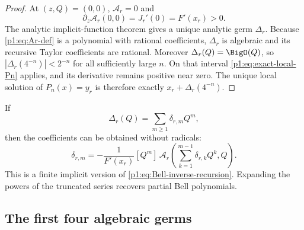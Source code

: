 \documentclass[11pt,oneside]{article}
\numberwithin{equation}{section}
\theoremstyle{definition}
\theoremstyle{remark}
\begin{document}
\begin{proof}
At $(z,Q)=(0,0)$, $\mathcal A_r=0$ and
\[
 \partial_z\mathcal A_r(0,0)=J_r'(0)=F'(x_r)>0.
\]
The analytic implicit-function theorem gives a unique analytic germ $\Delta_r$.
Because \eqref{p1:eq:Ar-def} is a polynomial with rational coefficients,
$\Delta_r$ is algebraic and its recursive Taylor coefficients are rational.
Moreover $\Delta_r(Q)=\BigO(Q)$, so
$|\Delta_r(4^{-n})|<2^{-n}$ for all sufficiently large $n$.  On that interval
\eqref{p1:eq:exact-local-Pn} applies, and its derivative remains positive near zero.
The unique local solution of $P_n(x)=y_r$ is therefore exactly
$x_r+\Delta_r(4^{-n})$.
\end{proof}

If
\begin{equation}
 \Delta_r(Q)=\sum_{m\ge1}\delta_{r,m}Q^m,
 \label{p1:eq:Delta-series}
\end{equation}
then the coefficients can be obtained without radicals:
\begin{equation}
 \boxed{
 \delta_{r,m}=-\frac1{F'(x_r)}[Q^m]\,
 \mathcal A_r\!\left(\sum_{k=1}^{m-1}\delta_{r,k}Q^k,Q\right).}
 \label{p1:eq:Delta-recursion}
\end{equation}
This is a finite implicit version of \eqref{p1:eq:Bell-inverse-recursion}.  Expanding the
powers of the truncated series recovers partial Bell polynomials.

\subsection{The first four algebraic germs}
\end{document}
